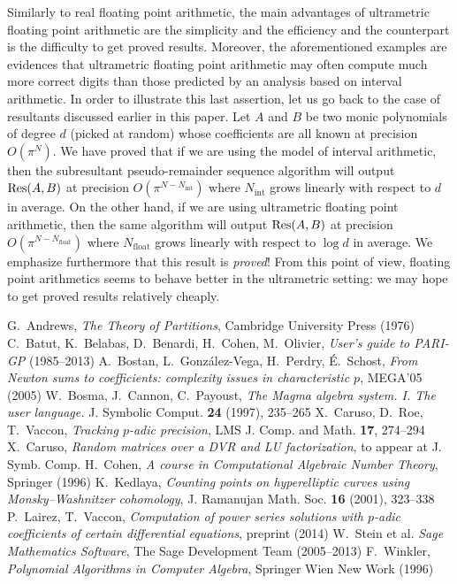\documentclass{sig-alternate}
\begin{document}
Similarly to real floating point arithmetic, the main advantages of 
ultrametric floating point arithmetic are the simplicity and the 
efficiency and the counterpart is the difficulty to get proved results. 
Moreover, the aforementioned examples are evidences that ultrametric 
floating point arithmetic may often compute much more correct digits 
than those predicted by an analysis based on interval arithmetic. In 
order to illustrate this last assertion, let us go back to the case of 
resultants discussed earlier in this paper. Let $A$ and $B$ be two monic 
polynomials of degree $d$ (picked at random) whose coefficients are all 
known at precision $O(\pi^N)$. We have proved that if we are using the
model of interval arithmetic, then the subresultant pseudo-remainder
sequence algorithm will output $\text{\rm Res}(A,B)$ at precision 
$O(\pi^{N-N_{\text{int}}})$ where $N_{\text{int}}$ grows linearly 
with respect to $d$ in average. On the other hand, if we are using 
ultrametric floating point arithmetic, then the same algorithm will
output $\text{\rm Res}(A,B)$ at precision $O(\pi^{N-N_{\text{float}}})$ where 
$N_{\text{float}}$ grows linearly with respect to $\log d$ in average.
We emphasize furthermore that this result is \emph{proved}! From this
point of view, floating point arithmetics seems to behave better in
the ultrametric setting: we may hope to get proved results relatively
cheaply.

\begin{thebibliography}{99}
\footnotesize
{}
  G.~Andrews,
  \emph{The Theory of Partitions},
  Cambridge University Press (1976)
  C.~Batut, K.~Belabas, D.~Benardi, H.~Cohen, M.~Olivier, 
  \emph{User’s guide to PARI-GP} (1985--2013)
  A.~Bostan, L.~Gonz\'alez-Vega, H.~Perdry, É.~Schost, 
  \emph{From Newton sums to coefficients: complexity issues in characteristic $p$}, 
  MEGA’05 (2005)
  W.~Bosma, J.~Cannon, C.~Payoust, 
  \emph{The Magma algebra system. I. The user language.}
  J. Symbolic Comput. {\bf 24} (1997), 235--265
  X.~Caruso, D.~Roe, T.~Vaccon,
  \emph{Tracking $p$-adic precision},
  LMS J. Comp. and Math. {\bf 17}, 274--294
  X.~Caruso,
  \emph{Random matrices over a DVR and LU factorization},
  to appear at J. Symb. Comp.
  H.~Cohen,
  \emph{A course in Computational Algebraic Number Theory},
  Springer (1996)
  K.~Kedlaya,
  \emph{Counting points on hyperelliptic curves using Monsky--Washnitzer cohomology}, 
  J. Ramanujan Math. Soc. {\bf 16} (2001), 323--338
  P.~Lairez, T.~Vaccon,
  \emph{Computation of power series solutions with $p$-adic coefficients of certain differential equations},
  preprint (2014)
  W.~Stein et al.
  \emph{Sage Mathematics Software}, 
  The Sage Development Team (2005--2013)
  F.~Winkler,
  \emph{Polynomial Algorithms in Computer Algebra},
  Springer Wien New Work (1996)
\bibitem{}
\end{thebibliography}
\end{document}
